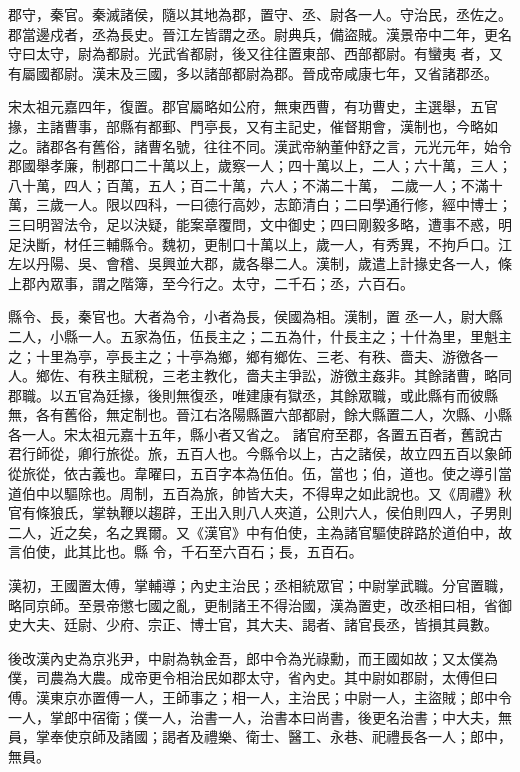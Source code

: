\begin{pinyinscope}
 郡守，秦官。秦滅諸侯，隨以其地為郡，置守、丞、尉各一人。守治民，丞佐之。郡當邊戍者，丞為長史。晉江左皆謂之丞。尉典兵，備盜賊。漢景帝中二年，更名守曰太守，尉為都尉。光武省都尉，後又往往置東部、西部都尉。有蠻夷
 者，又有屬國都尉。漢末及三國，多以諸部都尉為郡。晉成帝咸康七年，又省諸郡丞。



 宋太祖元嘉四年，復置。郡官屬略如公府，無東西曹，有功曹史，主選舉，五官掾，主諸曹事，部縣有都郵、門亭長，又有主記史，催督期會，漢制也，今略如之。諸郡各有舊俗，諸曹名號，往往不同。漢武帝納董仲舒之言，元光元年，始令郡國舉孝廉，制郡口二十萬以上，歲察一人；四十萬以上，二人；六十萬，三人；八十萬，四人；百萬，五人；百二十萬，六人；不滿二十萬，
 二歲一人；不滿十萬，三歲一人。限以四科，一曰德行高妙，志節清白；二曰學通行修，經中博士；三曰明習法令，足以決疑，能案章覆問，文中御史；四曰剛毅多略，遭事不惑，明足決斷，材任三輔縣令。魏初，更制口十萬以上，歲一人，有秀異，不拘戶口。江左以丹陽、吳、會稽、吳興並大郡，歲各舉二人。漢制，歲遣上計掾史各一人，條上郡內眾事，謂之階簿，至今行之。太守，二千石；丞，六百石。



 縣令、長，秦官也。大者為令，小者為長，侯國為相。漢制，置
 丞一人，尉大縣二人，小縣一人。五家為伍，伍長主之；二五為什，什長主之；十什為里，里魁主之；十里為亭，亭長主之；十亭為鄉，鄉有鄉佐、三老、有秩、嗇夫、游徼各一人。鄉佐、有秩主賦稅，三老主教化，嗇夫主爭訟，游徼主姦非。其餘諸曹，略同郡職。以五官為廷掾，後則無復丞，唯建康有獄丞，其餘眾職，或此縣有而彼縣無，各有舊俗，無定制也。晉江右洛陽縣置六部都尉，餘大縣置二人，次縣、小縣各一人。宋太祖元嘉十五年，縣小者又省之。
 諸官府至郡，各置五百者，舊說古君行師從，卿行旅從。旅，五百人也。今縣令以上，古之諸侯，故立四五百以象師從旅從，依古義也。韋曜曰，五百字本為伍伯。伍，當也；伯，道也。使之導引當道伯中以驅除也。周制，五百為旅，帥皆大夫，不得卑之如此說也。又《周禮》秋官有條狼氏，掌執鞭以趨辟，王出入則八人夾道，公則六人，侯伯則四人，子男則二人，近之矣，名之異爾。又《漢官》中有伯使，主為諸官驅使辟路於道伯中，故言伯使，此其比也。縣
 令，千石至六百石；長，五百石。



 漢初，王國置太傅，掌輔導；內史主治民；丞相統眾官；中尉掌武職。分官置職，略同京師。至景帝懲七國之亂，更制諸王不得治國，漢為置吏，改丞相曰相，省御史大夫、廷尉、少府、宗正、博士官，其大夫、謁者、諸官長丞，皆損其員數。



 後改漢內史為京兆尹，中尉為執金吾，郎中令為光祿勳，而王國如故；又太僕為僕，司農為大農。成帝更令相治民如郡太守，省內史。其中尉如郡尉，太傅但曰
 傅。漢東京亦置傅一人，王師事之；相一人，主治民；中尉一人，主盜賊；郎中令一人，掌郎中宿衛；僕一人，治書一人，治書本曰尚書，後更名治書；中大夫，無員，掌奉使京師及諸國；謁者及禮樂、衛士、醫工、永巷、祀禮長各一人；郎中，無員。




\end{pinyinscope}
